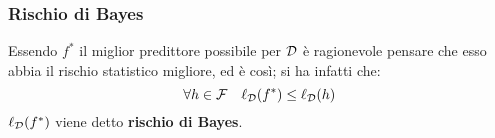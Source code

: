 \subsubsection{Rischio di Bayes}
Essendo $f^*$ il miglior predittore possibile per $\mathcal{D}$ è ragionevole pensare che esso
abbia il rischio statistico migliore, ed è così; si ha infatti che:
$$ \forall h \in \mathcal{F} \quad \ell_{\mathcal{D}}(f^*) \leq \ell_{\mathcal{D}}(h) $$
$\ell_{\mathcal{D}}(f^*)$ viene detto \textbf{rischio di Bayes}.